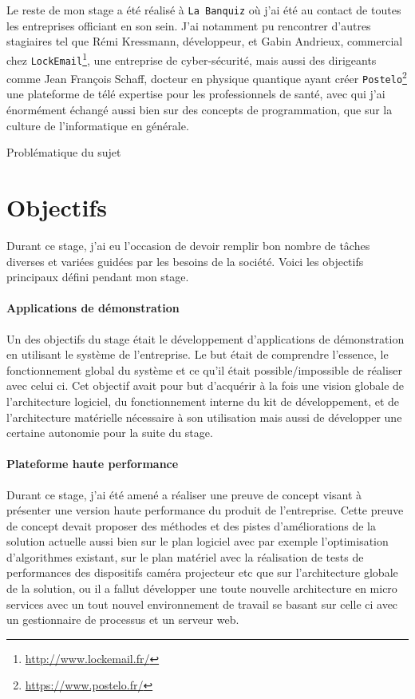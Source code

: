 Le reste de mon stage a été réalisé à \texttt{La Banquiz} où j'ai été au contact de toutes les entreprises officiant en son sein. J'ai notamment pu rencontrer d'autres stagiaires tel que Rémi Kressmann, développeur, et Gabin Andrieux, commercial chez \texttt{LockEmail}\footnote{\href{http://www.lockemail.fr/}{http://www.lockemail.fr/}}, une entreprise de cyber-sécurité, mais aussi des dirigeants comme Jean François Schaff, docteur en physique quantique ayant créer \texttt{Postelo}\footnote{\href{https://www.postelo.fr/}{https://www.postelo.fr/}} une plateforme de télé expertise pour les professionnels de santé, avec qui j'ai énormément échangé aussi bien sur des concepts de programmation, que sur la culture de l'informatique en générale.

\begin{center}
Problématique du sujet
\end{center}

\section{Objectifs}

Durant ce stage, j'ai eu l'occasion de devoir remplir bon nombre de tâches diverses et variées guidées par les besoins de la société. Voici les objectifs principaux défini pendant mon stage.

\paragraph{Applications de démonstration} Un des objectifs du stage était le développement d'applications de démonstration en utilisant le système de l'entreprise. Le but était de comprendre l'essence, le fonctionnement global du système et ce qu'il était possible/impossible de réaliser avec celui ci. Cet objectif avait pour but d'acquérir à la fois une vision globale de l'architecture logiciel, du fonctionnement interne du kit de développement, et de l'architecture matérielle nécessaire à son utilisation mais aussi de développer une certaine autonomie pour la suite du stage.

\paragraph{Plateforme haute performance} Durant ce stage, j'ai été amené a réaliser une preuve de concept visant à présenter une version haute performance du produit de l'entreprise. Cette preuve de concept devait proposer des méthodes et des pistes d'améliorations de la solution actuelle aussi bien  sur le plan logiciel avec par exemple l'optimisation d'algorithmes existant, sur le plan matériel avec la réalisation de tests de performances des dispositifs caméra projecteur etc que sur l'architecture globale de la solution, ou il a fallut développer une toute nouvelle architecture en micro services avec un tout nouvel environnement de travail se basant sur celle ci avec un gestionnaire de processus et un serveur web.

